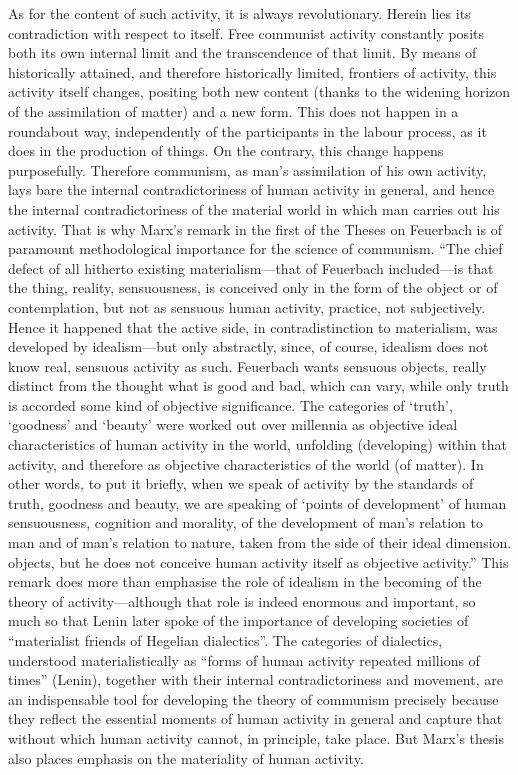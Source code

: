 \documentclass[12pt,a4paper,openany]{book}
\begin{document}
As for the content of such activity, it is always revolutionary. Herein lies its contradiction with respect to itself. Free communist activity constantly posits both its own internal limit and the transcendence of that limit. By means of historically attained, and therefore historically limited, frontiers of activity, this activity itself changes, positing both new content (thanks to the widening horizon of the assimilation of matter) and a new form. This does not happen in a roundabout way, independently of the participants in the labour process, as it does in the production of things. On the contrary, this change happens purposefully. Therefore communism, as man’s assimilation of his own activity, lays bare the internal contradictoriness of human activity in general, and hence the internal contradictoriness of the material world in which man carries out his activity. That is why Marx’s remark in the first of the Theses on Feuerbach is of paramount methodological importance for the science of communism. “The chief defect of all hitherto existing materialism—that of Feuerbach included—is that the thing, reality, sensuousness, is conceived only in the form of the object or of contemplation, but not as sensuous human activity, practice, not subjectively. Hence it happened that the active side, in contradistinction to materialism, was developed by idealism—but only abstractly, since, of course, idealism does not know real, sensuous activity as such. Feuerbach wants sensuous objects, really distinct from the thought what is good and bad, which can vary, while only truth is accorded some kind of objective significance. The categories of ‘truth’, ‘goodness’ and ‘beauty’ were worked out over millennia as objective ideal characteristics of human activity in the world, unfolding (developing) within that activity, and therefore as objective characteristics of the world (of matter). In other words, to put it briefly, when we speak of activity by the standards of truth, goodness and beauty, we are speaking of ‘points of development’ of human sensuousness, cognition and morality, of the development of man’s relation to man and of man’s relation to nature, taken from the side of their ideal dimension. objects, but he does not conceive human activity itself as objective activity.” This remark does more than emphasise the role of idealism in the becoming of the theory of activity—although that role is indeed enormous and important, so much so that Lenin later spoke of the importance of developing societies of “materialist friends of Hegelian dialectics”. The categories of dialectics, understood materialistically as “forms of human activity repeated millions of times” (Lenin), together with their internal contradictoriness and movement, are an indispensable tool for developing the theory of communism precisely because they reflect the essential moments of human activity in general and capture that without which human activity cannot, in principle, take place. But Marx’s thesis also places emphasis on the materiality of human activity.
\end{document}
